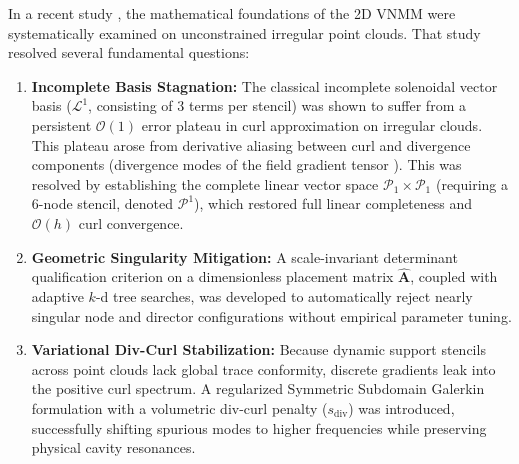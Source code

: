 \documentclass[VANCOUVER,Times1COL]{WileyNJD-v5}
\begin{document}
In a recent study \cite{stable_vnmm2d_2026}, the mathematical foundations of the 2D VNMM were systematically examined on unconstrained irregular point clouds. That study resolved several fundamental questions:
\begin{enumerate}
    \item \textbf{Incomplete Basis Stagnation:} The classical incomplete solenoidal vector basis ($\mathcal{L}^1$, consisting of 3 terms per stencil) was shown to suffer from a persistent $\mathcal{O}(1)$ error plateau in curl approximation on irregular clouds. This plateau arose from derivative aliasing between curl and divergence components (divergence modes of the field gradient tensor \cite{stable_vnmm2d_2026}). This was resolved by establishing the complete linear vector space $\mathcal{P}_1 \times \mathcal{P}_1$ (requiring a 6-node stencil, denoted $\mathcal{P}^1$), which restored full linear completeness and $\mathcal{O}(h)$ curl convergence.
    \item \textbf{Geometric Singularity Mitigation:} A scale-invariant determinant qualification criterion on a dimensionless placement matrix $\widehat{\mathbf{A}}$, coupled with adaptive $k$-d tree searches, was developed to automatically reject nearly singular node and director configurations without empirical parameter tuning.
    \item \textbf{Variational Div-Curl Stabilization:} Because dynamic support stencils across point clouds lack global trace conformity, discrete gradients leak into the positive curl spectrum. A regularized Symmetric Subdomain Galerkin formulation with a volumetric div-curl penalty ($s_{\mathrm{div}}$) was introduced, successfully shifting spurious modes to higher frequencies while preserving physical cavity resonances.
\end{enumerate}
\end{document}
